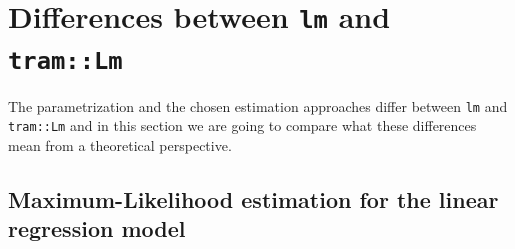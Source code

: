 \documentclass[11pt,a4paper,twoside]{book}\usepackage[]{graphicx}\usepackage[]{xcolor}
\begin{document}
\section{Differences between \texttt{lm} and \texttt{tram::Lm}}

The parametrization and the chosen estimation approaches differ between \texttt{lm} and 
\texttt{tram::Lm} and in this section we are going to compare what these differences mean from a theoretical perspective.

\subsection{Maximum-Likelihood estimation for the linear regression model}\label{sec:mlnlm}
\end{document}
